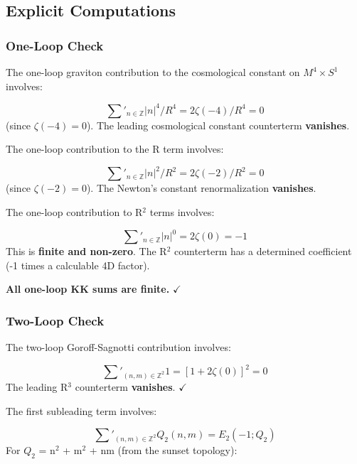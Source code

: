 \documentclass[aps,prd,preprint,superscriptaddress,longbibliography,floatfix]{revtex4-2}
\theoremstyle{remark}
\begin{document}
\subsection{Explicit Computations}


\subsubsection{One-Loop Check}

The one-loop graviton contribution to the cosmological constant on $M^{4} \times S^{1}$ involves:


\begin{equation}
    \sum'_{n \in \mathbb{Z}} |n|^{4}/R^{4} = 2\zeta(-4)/R^{4} = 0
\end{equation}
(since $\zeta(-4) = 0$). The leading cosmological constant counterterm \textbf{vanishes}.

The one-loop contribution to the R term involves:


\begin{equation}
    \sum'_{n \in \mathbb{Z}} |n|^{2}/R^{2} = 2\zeta(-2)/R^{2} = 0
\end{equation}
(since $\zeta(-2) = 0$). The Newton's constant renormalization \textbf{vanishes}.

The one-loop contribution to R$^{2}$ terms involves:


\begin{equation}
    \sum'_{n \in \mathbb{Z}} |n|^{0} = 2\zeta(0) = -1
\end{equation}
This is \textbf{finite and non-zero}. The R$^{2}$ counterterm has a determined coefficient (-1 times a calculable 4D factor).

\textbf{All one-loop KK sums are finite.} $\checkmark$


\subsubsection{Two-Loop Check}

The two-loop Goroff-Sagnotti contribution involves:


\begin{equation}
    \sum'_{(n,m) \in \mathbb{Z}^2} 1 = [1 + 2\zeta(0)]^{2} = 0
\end{equation}
The leading R$^{3}$ counterterm \textbf{vanishes}. $\checkmark$

The first subleading term involves:


\begin{equation}
    \sum'_{(n,m) \in \mathbb{Z}^2} Q_{2}(n,m) = E_{2}(-1; Q_{2})
\end{equation}
For $Q_{2}$ = n$^{2}$ + m$^{2}$ + nm (from the sunset topology):
\end{document}
